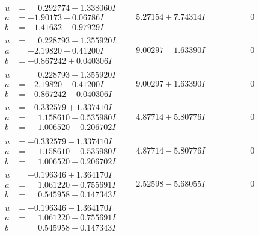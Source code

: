 \documentclass[1p]{elsarticle_modified}
\theoremstyle{definition}
\begin{document}
$$\begin{array}{c|c|c}
\begin{aligned}
u &= \phantom{-}0.292774 - 1.338060 I \\
a &= -1.90173 - 0.06786 I \\
b &= -1.41632 - 0.97929 I\end{aligned}
 & \phantom{-}5.27154 + 7.74314 I & \phantom{-0.000000 } 0 \\ \hline\begin{aligned}
u &= \phantom{-}0.228793 + 1.355920 I \\
a &= -2.19820 + 0.41200 I \\
b &= -0.867242 + 0.040306 I\end{aligned}
 & \phantom{-}9.00297 - 1.63390 I & \phantom{-0.000000 } 0 \\ \hline\begin{aligned}
u &= \phantom{-}0.228793 - 1.355920 I \\
a &= -2.19820 - 0.41200 I \\
b &= -0.867242 - 0.040306 I\end{aligned}
 & \phantom{-}9.00297 + 1.63390 I & \phantom{-0.000000 } 0 \\ \hline\begin{aligned}
u &= -0.332579 + 1.337410 I \\
a &= \phantom{-}1.158610 - 0.535980 I \\
b &= \phantom{-}1.006520 + 0.206702 I\end{aligned}
 & \phantom{-}4.87714 + 5.80776 I & \phantom{-0.000000 } 0 \\ \hline\begin{aligned}
u &= -0.332579 - 1.337410 I \\
a &= \phantom{-}1.158610 + 0.535980 I \\
b &= \phantom{-}1.006520 - 0.206702 I\end{aligned}
 & \phantom{-}4.87714 - 5.80776 I & \phantom{-0.000000 } 0 \\ \hline\begin{aligned}
u &= -0.196346 + 1.364170 I \\
a &= \phantom{-}1.061220 - 0.755691 I \\
b &= \phantom{-}0.545958 - 0.147343 I\end{aligned}
 & \phantom{-}2.52598 - 5.68055 I & \phantom{-0.000000 } 0 \\ \hline\begin{aligned}
u &= -0.196346 - 1.364170 I \\
a &= \phantom{-}1.061220 + 0.755691 I \\
b &= \phantom{-}0.545958 + 0.147343 I\end{aligned}

\end{array}$$
\end{document}
